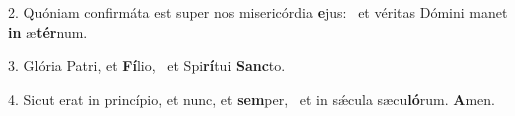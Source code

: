2. Quóniam confirmáta est super nos misericórdia \textbf{e}jus: \ast\  et véritas Dómini manet \textbf{in} æ\textbf{tér}num.\

3. Glória Patri, et \textbf{Fí}lio, \ast\  et Spi\textbf{rí}tui \textbf{Sanc}to.\

4. Sicut erat in princípio, et nunc, et \textbf{sem}per, \ast\  et in sǽcula sæcu\textbf{ló}rum. \textbf{A}men.\

